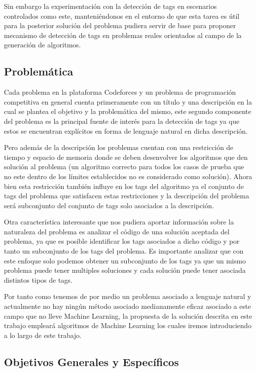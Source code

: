 \documentclass{article}
\begin{document}
Sin embargo la experimentación con la detección de tags en escenarios controlados como este, manteniéndonos en el entorno
de que esta tarea es útil para la posterior solución del problema pudiera servir de base para proponer mecanismo de detección
de tags en problemas reales orientados al campo de la generación de algoritmos.

\subsection{Problemática}

Cada problema en la plataforma Codeforces y un problema de programación competitiva en general cuenta primeramente con
un título y una descripción en la cual se plantea el objetivo y la problemática del mismo, este segundo componente del
problema es la principal fuente de interés para la detección de tags ya que estos se encuentran explícitos en forma de
lenguaje natural en dicha descripción.

Pero además de la descripción los problemas cuentan con una restricción de tiempo y espacio de memoria donde se deben
desenvolver los algoritmos que den solución al problema (un algoritmo correcto para todos los casos de prueba
que no este dentro de los límites establecidos no es considerado como solución). Ahora bien esta restricción también
influye en los tags del algoritmo ya el conjunto de tags del problema que satisfacen estas restricciones y la descripción
del problema será subconjunto del conjunto de tags solo asociados a la descripción.

Otra característica interesante que nos pudiera aportar información sobre la naturaleza del problema es analizar el
código de una solución aceptada del problema, ya que es posible identificar los tags asociados a dicho código y por
tanto un subconjunto de los tags del problema. Es importante analizar que con este enfoque solo podemos obtener un
subconjunto de los tags ya que un mismo problema puede tener multiples soluciones y cada solución puede tener asociada
distintos tipos de tags.

Por tanto como tenemos de por medio un problema asociado a lenguaje natural y actualmente no hay ningún método asociado
medianamente eficaz asociado a este campo que no lleve Machine Learning, la propuesta de la solución descrita en este
trabajo empleará algoritmos de Machine Learning los cuales iremos introduciendo a lo largo de este trabajo.

\subsection{Objetivos Generales y Específicos}
\end{document}
